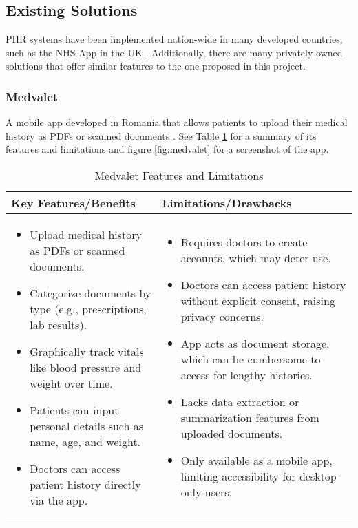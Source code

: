 \clearpage

\subsection{Existing Solutions}

PHR systems have been implemented nation-wide in many developed countries, such as the NHS App in the UK \parencite{phrlist}. Additionally, there are many privately-owned solutions that offer similar features to the one proposed in this project. 

\subsubsection{Medvalet}

A mobile app developed in Romania that allows patients to upload their medical history as PDFs or scanned documents \parencite{medvalet}. See Table \ref{tab:medvalet} for a summary of its features and limitations and figure \ref{fig:medvalet} for a screenshot of the app.

\begin{table}[h!]
\centering
    \begin{tabular}{|p{}|p{}|}
    \hline
    \textbf{Key Features/Benefits} & \textbf{Limitations/Drawbacks} \\ \hline
    \begin{itemize}
        \item Upload medical history as PDFs or scanned documents.
        \item Categorize documents by type (e.g., prescriptions, lab results).
        \item Graphically track vitals like blood pressure and weight over time.
        \item Patients can input personal details such as name, age, and weight.
        \item Doctors can access patient history directly via the app.
    \end{itemize} &
    \begin{itemize}
        \item Requires doctors to create accounts, which may deter use.
        \item Doctors can access patient history without explicit consent, raising privacy concerns.
        \item App acts as document storage, which can be cumbersome to access for lengthy histories.
        \item Lacks data extraction or summarization features from uploaded documents.
        \item Only available as a mobile app, limiting accessibility for desktop-only users.
    \end{itemize} \\ \hline
    \end{tabular}
\caption{Medvalet Features and Limitations}
\label{tab:medvalet}
\end{table}


